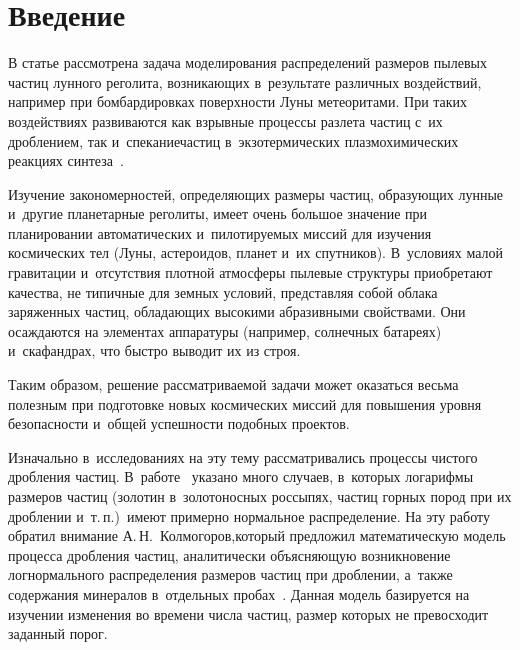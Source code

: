 
 
\vspace*{9pt}



\thispagestyle{headings}

\begin{multicols}{2}

\label{st\stat}


\section{Введение}

\vspace*{-3pt}

В статье рассмотрена задача моделирования распределений размеров пылевых 
частиц лунного ре\-го\-лита, возникающих в~результате различных воздействий, 
например при бомбардировках \mbox{поверхности} Луны метеоритами. При таких 
воз\-действиях развиваются как взрывные процессы разлета час\-тиц с~их 
дроблением, так и~спекание\linebreak час\-тиц в~экзотермических плазмохимических 
реакциях синтеза~\cite{Popel2018}.

Изучение закономерностей, определяющих размеры частиц, образующих лунные 
и~другие планетарные реголиты, имеет очень большое значение при 
планировании автоматических и~пи\-ло\-ти\-ру\-емых миссий для изучения 
космических тел (Луны, астероидов, планет и~их спутников). В~условиях 
малой гравитации и~отсутствия плотной атмосферы пылевые структуры 
приобретают качества, не типичные для земных условий, представляя собой 
облака заряженных частиц, обладающих высокими абразивными свойствами. Они 
осаждаются на элементах аппаратуры (например, солнечных батареях) 
и~скафандрах, что быстро выводит их из строя. 

Таким образом, решение 
рассматриваемой задачи может оказаться весьма полезным при подготовке 
новых космических миссий для повышения уровня безопасности и~общей 
успешности подобных проектов.

Изначально в~исследованиях на эту тему рассматривались процессы чистого 
дробления частиц. В~работе~\cite{Razumovskii1940} указано много случаев, 
в~которых логарифмы размеров частиц (золотин в~золотоносных россыпях, 
частиц горных пород при их дроблении и~т.\,п.)\ имеют примерно нормальное 
распределение. На эту работу обратил внимание А.\,Н.~Колмогоров,\linebreak который 
предложил математическую модель процесса дробления частиц, аналитически 
объяс\-ня\-ющую возникновение логнормального распределения размеров частиц 
при дроблении, а~также \mbox{содержания} минералов в~отдельных 
пробах~\cite{Kolmogorov1941}. Данная модель базируется на изучении 
изменения во времени числа частиц, размер которых не превосходит заданный 
порог.


\end{multicols}
